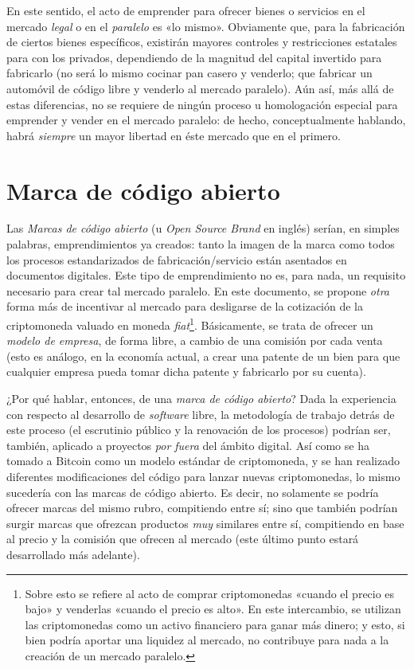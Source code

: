 \documentclass[12pt,a4paper]{article}
\begin{document}
En este sentido, el acto de emprender para ofrecer bienes o servicios en el mercado \textit{legal} o en el \textit{paralelo} es «lo mismo». Obviamente que, para la fabricación de ciertos bienes específicos, existirán mayores controles y restricciones estatales para con los privados, dependiendo de la magnitud del capital invertido para fabricarlo (no será lo mismo cocinar pan casero y venderlo; que fabricar un automóvil de código libre y venderlo al mercado paralelo). Aún así, más allá de estas diferencias, no se requiere de ningún proceso u homologación especial para emprender y vender en el mercado paralelo: de hecho, conceptualmente hablando, habrá \textit{siempre} un mayor libertad en éste mercado que en el primero.

\section{Marca de código abierto}
Las \textit{Marcas de código abierto} (u \textit{Open Source Brand} en inglés) serían, en simples palabras, emprendimientos ya creados: tanto la imagen de la marca como todos los procesos estandarizados de fabricación/servicio están asentados en documentos digitales. Este tipo de emprendimiento no es, para nada, un requisito necesario para crear tal mercado paralelo. En este documento, se propone \textit{otra} forma más de incentivar al mercado para desligarse de la cotización de la criptomoneda valuado en moneda \textit{fiat}\footnote{Sobre esto se refiere al acto de comprar criptomonedas «cuando el precio es bajo» y venderlas «cuando el precio es alto». En este intercambio, se utilizan las criptomonedas como un activo financiero para ganar más dinero; y esto, si bien podría aportar una liquidez al mercado, no contribuye para nada a la creación de un mercado paralelo.}. Básicamente, se trata de ofrecer un \textit{modelo de empresa}, de forma libre, a cambio de una comisión por cada venta (esto es análogo, en la economía actual, a crear una patente de un bien para que cualquier empresa pueda tomar dicha patente y fabricarlo por su cuenta).

¿Por qué hablar, entonces, de una \textit{marca de código abierto}? Dada la experiencia con respecto al desarrollo de \textit{software} libre, la metodología de trabajo detrás de este proceso (el escrutinio público y la renovación de los procesos) podrían ser, también, aplicado a proyectos \textit{por fuera} del ámbito digital. Así como se ha tomado a Bitcoin como un modelo estándar de criptomoneda, y se han realizado diferentes modificaciones del código para lanzar nuevas criptomonedas, lo mismo sucedería con las marcas de código abierto. Es decir, no solamente se podría ofrecer marcas del mismo rubro, compitiendo entre sí; sino que también podrían surgir marcas que ofrezcan productos \textit{muy} similares entre sí, compitiendo en base al precio y la comisión que ofrecen al mercado (este último punto estará desarrollado más adelante). 
\end{document}
